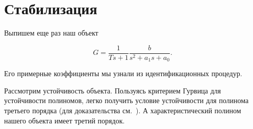 \documentclass[12pt,a4paper]{article}
\begin{document}
\section{Стабилизация}

Выпишем еще раз наш объект

$$ G = \frac{1}{Ts+1} \frac{b}{s^2+a_1s+a_0} .$$

Его примерные коэффициенты мы узнали из идентификационных процедур.

Рассмотрим устойчивость объекта. Пользуясь критерием Гурвица для устойчивости полиномов, легко получить условие устойчивости для полинома третьего порядка (для доказательства см.~\cite{polyak_scherbakov_robust}). А характеристический полином нашего объекта имеет третий порядок.







\end{document}
